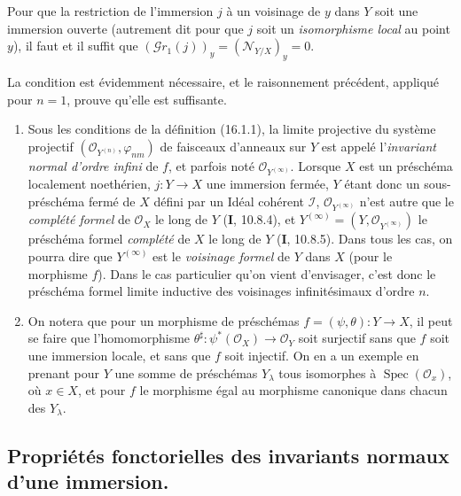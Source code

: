 \begin{corollary}[16.1.10]
\label{IV.16.1.10}
Pour que la restriction de l'immersion $j$ à un voisinage de $y$ dans $Y$ soit
une immersion ouverte \textup{(autrement dit pour que $j$ soit un \emph{isomorphisme local} au
point $y$)}, il faut et il suffit que
$(\mathscr{G}r_1(j))_y=(\mathscr{N}_{Y/X})_y=0$.
\end{corollary}

La condition est évidemment nécessaire, et le raisonnement précédent, appliqué
pour $n=1$, prouve qu'elle est suffisante.

\begin{remarks}[16.1.11]
\begin{enumerate}
\item[(i)] Sous les conditions de la définition (16.1.1), la limite projective
du système projectif
$(\mathcal{O}_{Y^{(n)}},\varphi_{nm})$ de faisceaux d'anneaux sur $Y$ est
appelé l'\emph{invariant normal d'ordre infini} de $f$, et parfois noté
$\mathcal{O}_{Y^{(\infty)}}$. Lorsque $X$ est un préschéma localement
noethérien, $j:Y\to X$ une immersion fermée, $Y$ étant donc un sous-préschéma
fermé de $X$ défini par un Idéal cohérent $\mathscr{I}$,
$\mathcal{O}_{Y^{(\infty)}}$ n'est autre que le \emph{complété formel} de
$\mathcal{O}_X$ le long de $Y$ (\textbf{I}, 10.8.4), et
$Y^{(\infty)}=(Y,\mathcal{O}_{Y^{(\infty)}})$ le préschéma formel \emph{complété} de
$X$ le long de $Y$ (\textbf{I}, 10.8.5). Dans tous les cas, on pourra dire que
$Y^{(\infty)}$ est le \emph{voisinage formel} de $Y$ dans $X$ (pour le morphisme
$f$). Dans le cas particulier qu'on vient d'envisager, c'est donc le préschéma
formel limite inductive des voisinages infinitésimaux d'ordre $n$.
\item[(ii)] On notera que pour un morphisme de préschémas
$f=(\psi,\theta):Y\to X$, il peut se faire que l'homomorphisme
$\theta^\sharp:\psi^*(\mathcal{O}_X)\to\mathcal{O}_Y$ soit surjectif sans que $f$
soit une immersion
locale, et sans que $f$ soit injectif. On en a un exemple en prenant pour $Y$
une somme de préschémas $Y_\lambda$ tous isomorphes à
$\operatorname{Spec}(\mathcal{O}_x)$, où $x\in X$, et pour $f$ le morphisme
égal au morphisme canonique dans chacun des $Y_\lambda$.
\end{enumerate}
\end{remarks}

\subsection{Propriétés fonctorielles des invariants normaux d'une immersion.}

